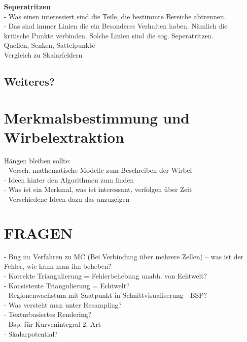 \documentclass{article}
\begin{document}
\noindent \textbf{Seperatritzen}\\
- Was einen interessiert sind die Teile, die bestimmte Bereiche abtrennen.\\
- Das sind immer Linien die ein Besonderes Verhalten haben. Nämlich die kritische Punkte verbinden. Solche Linien sind die sog. Seperatritzen.\\

\noindent Quellen, Senken, Sattelpunkte\\

\noindent Vergleich zu Skalarfeldern

\subsection{Weiteres?}

\pagebreak
\section{Merkmalsbestimmung und Wirbelextraktion}
Hängen bleiben sollte:\\
- Versch. mathematische Modelle zum Beschreiben der Wirbel\\
- Ideen hinter den Algorithmen zum finden \\
- Was ist ein Merkmal, was ist interessant, verfolgen über Zeit\\
- Verschiedene Ideen dazu das anzuzeigen

\pagebreak
\section{FRAGEN}
- Bug im Verfahren zu MC (Bei Verbindung über mehrere Zellen) -- was ist der Fehler, wie kann man ihn beheben?\\
- Korrekte Triangulierung = Fehlerbehebung unabh. von Echtwelt?\\ 
- Konsistente Triangulierung = Echtwelt?\\
- Regionenwachstum mit Saatpunkt in Schnittvisualiserung - BSP?\\
- Was versteht man unter Resampling?\\
- Texturbasiertes Rendering?\\
- Bsp. für Kurvenintegral 2. Art\\
- Skalarpotential?
\end{document}
